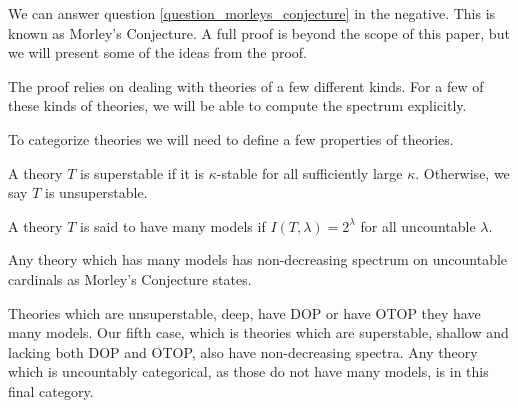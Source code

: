 We can answer question \ref{question_morleys_conjecture} in the negative. This is known as Morley's Conjecture. A full proof is beyond the scope of this paper, but we will present some of the ideas from the proof. 

The proof relies on dealing with theories of a few different kinds.\cite{hart}
For a few of these kinds of theories, we will be able to compute the spectrum explicitly.

To categorize theories we will need to define a few properties of theories. 

\begin{definition}\label{definition_superstable}
A theory \(T\) is superstable if it is \(\kappa\)-stable for all sufficiently large \(\kappa\). Otherwise, we say \(T\) is unsuperstable. 
\end{definition}

%
%
%
%

\begin{definition}\label{definition_many_models}
A theory \(T\) is said to have many models if \(I(T, \lambda) = 2^\lambda\) for all uncountable \(\lambda\). 
\end{definition}

Any theory which has many models has non-decreasing spectrum on uncountable cardinals as Morley's Conjecture states. 

Theories which are unsuperstable, deep, have DOP or have OTOP they have many models. 
Our fifth case, which is theories which are superstable, shallow and lacking both DOP and OTOP, also have non-decreasing spectra. 
Any theory which is uncountably categorical, as those do not have many models, is in this final category. 

